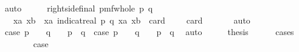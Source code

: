\begin{isabellebody}
\ auto\isanewline
\ \ \isamarkupfalse%
\ \isamarkupfalse%
\ right{\isacharunderscore}{\kern0pt}side{\isacharunderscore}{\kern0pt}final{\isacharcolon}{\kern0pt}\ {\isachardoublequoteopen}{\isacharquery}{\kern0pt}pmf{\isacharunderscore}{\kern0pt}whole\ {\isacharparenleft}{\kern0pt}p{\isacharcomma}{\kern0pt}\ q{\isacharparenright}{\kern0pt}\ \isanewline
\ \ {\isacharequal}{\kern0pt}\ {\isacharparenleft}{\kern0pt}{\isacharparenleft}{\kern0pt}{\isasymSum}xa{\isasymin}{\isasymK}{\isachardot}{\kern0pt}\ {\isacharparenleft}{\kern0pt}{\isasymSum}xb{\isasymin}{\isacharparenleft}{\kern0pt}{\isasymK}\ {\isacharminus}{\kern0pt}\ {\isacharbraceleft}{\kern0pt}xa{\isacharbraceright}{\kern0pt}{\isacharparenright}{\kern0pt}{\isachardot}{\kern0pt}\ {\isacharparenleft}{\kern0pt}indicat{\isacharunderscore}{\kern0pt}real\ {\isacharbraceleft}{\kern0pt}{\isacharparenleft}{\kern0pt}p{\isacharcomma}{\kern0pt}\ q{\isacharparenright}{\kern0pt}{\isacharbraceright}{\kern0pt}\ {\isacharparenleft}{\kern0pt}xa{\isacharcomma}{\kern0pt}\ xb{\isacharparenright}{\kern0pt}{\isacharparenright}{\kern0pt}{\isacharparenright}{\kern0pt}{\isacharparenright}{\kern0pt}{\isacharparenright}{\kern0pt}\ {\isacharslash}{\kern0pt}\ {\isacharparenleft}{\kern0pt}{\isacharparenleft}{\kern0pt}card\ {\isasymK}\ {\isacharminus}{\kern0pt}\ {}{\isacharparenright}{\kern0pt}\ {\isacharasterisk}{\kern0pt}\ {\isacharparenleft}{\kern0pt}card\ {\isasymK}{\isacharparenright}{\kern0pt}{\isacharparenright}{\kern0pt}{\isachardoublequoteclose}\isanewline
\ \ \ \ \isamarkupfalse%
\ auto\isanewline
\isanewline
\ \ \isamarkupfalse%
\ {\isacharparenleft}{\kern0pt}case{\isacharunderscore}{\kern0pt}{}{\isacharparenright}{\kern0pt}\ {\isachardoublequoteopen}p\ {\isasymnotin}\ {\isasymK}\ {\isasymor}\ q\ {\isasymnotin}\ {\isasymK}\ {\isasymor}\ p\ {\isacharequal}{\kern0pt}\ q{\isachardoublequoteclose}\ {\isacharbar}{\kern0pt}\ {\isacharparenleft}{\kern0pt}case{\isacharunderscore}{\kern0pt}{}{\isacharparenright}{\kern0pt}\ {\isachardoublequoteopen}p\ {\isasymin}\ {\isasymK}\ {\isasymand}\ q\ {\isasymin}\ {\isasymK}\ {\isasymand}\ p\ {\isasymnoteq}\ q{\isachardoublequoteclose}\ \isamarkupfalse%
\ auto\isanewline
\ \ \isamarkupfalse%
\ \isamarkupfalse%
\ {\isacharquery}{\kern0pt}thesis\isanewline
\ \ \ \ \isamarkupfalse%
\ {\isacharparenleft}{\kern0pt}cases{\isacharparenright}{\kern0pt}\isanewline
\ \ \ \ \ \ \isamarkupfalse%
\ case{\isacharunderscore}{\kern0pt}{}\isanewline

\end{isabellebody}
